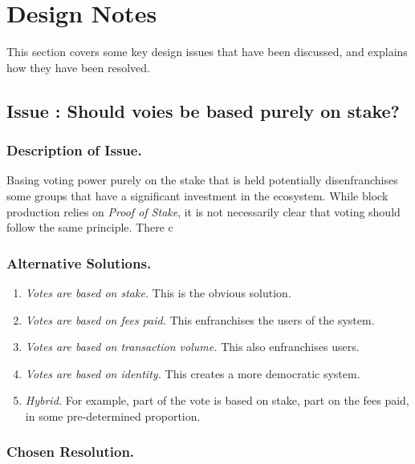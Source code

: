 \pagebreak
\section*{Design Notes}

This section covers some key design issues that have been discussed, and explains how they have been resolved.


\subsection*{Issue \theissue{}: Should voies be based purely on stake?}

\subsubsection*{Description of Issue.}

Basing voting power purely on the stake that is held potentially disenfranchises some groups that have a
significant investment in the ecosystem.  While block production relies on \emph{Proof of Stake},
it is not necessarily clear that voting should follow the same principle.  There c

\subsubsection*{Alternative Solutions.}

\begin{enumerate}
\item
  \emph{Votes are based on stake.}  This is the obvious solution.
\item
  \emph{Votes are based on fees paid.}  This enfranchises the users of the system.
\item
  \emph{Votes are based on transaction volume.}  This also enfranchises users.
\item
  \emph{Votes are based on identity.}  This creates a more democratic system.
\item
  \emph{Hybrid.}  For example, part of the vote is based on stake, part on the fees paid, in some pre-determined proportion.
\end{enumerate}

\subsubsection*{Chosen Resolution.}

